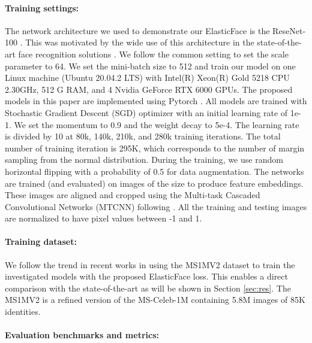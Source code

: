 \documentclass[letterpaper, 10 pt, conference]{ieeeconf}  \usepackage{times}
\begin{document}
\paragraph{Training settings:}
The network architecture we used to demonstrate our ElasticFace is the ReseNet-100 \cite{DBLP:conf/cvpr/HeZRS16}. This was motivated by the wide use of this architecture in the state-of-the-art face recognition solutions \cite{deng2019arcface,an2020partical_fc,uniformface,cricleloss,curricularface}. We follow the common setting \cite{deng2019arcface,an2020partical_fc,curricularface} to set the scale parameter  to 64.  
We set the mini-batch size to 512 and train our model on one Linux machine (Ubuntu 20.04.2 LTS) with Intel(R) Xeon(R) Gold 5218 CPU  2.30GHz, 512 G RAM, and  4 Nvidia GeForce RTX 6000 GPUs.
The proposed models in this paper are implemented using Pytorch \cite{NEURIPS2019_9015}.
All models are trained with Stochastic Gradient Descent (SGD) optimizer with an initial learning rate of 1e-1. 
We set the momentum to 0.9 and the weight decay to 5e-4. The learning rate is divided by 10 at 80k, 140k, 210k, and 280k training iterations. The total number of training iteration is 295K, which corresponds to the number of margin sampling from the normal distribution. 
During the training, we use random horizontal flipping with a probability of 0.5 for data augmentation.
The networks are trained (and evaluated) on images of the size  to produce  feature embeddings. 
These images are aligned and cropped using the Multi-task Cascaded Convolutional Networks (MTCNN)  \cite{zhang2016joint} following \cite{deng2019arcface}. All the training and testing images are normalized to have pixel values between -1 and 1.


\paragraph{Training dataset:} We follow the trend in recent works \cite{deng2019arcface,an2020partical_fc,curricularface,magface} in using the MS1MV2 dataset \cite{deng2019arcface} to train the investigated models with the proposed ElasticFace loss. 
This enables a direct comparison with the state-of-the-art as will be shown in Section \ref{sec:res}.
The MS1MV2 is a refined version \cite{deng2019arcface} of the MS-Celeb-1M \cite{DBLP:conf/eccv/GuoZHHG16} containing 5.8M images of 85K identities. 







\paragraph{Evaluation benchmarks and metrics:}
\end{document}
